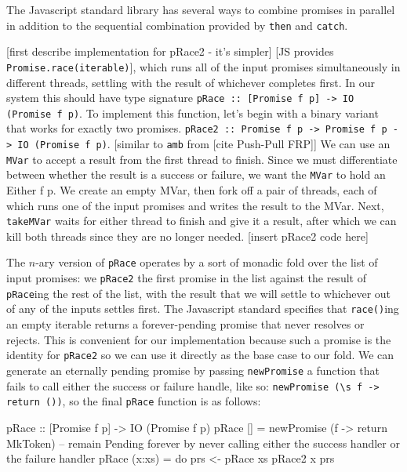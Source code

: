 \documentclass[12pt, english, letterpaper]{kuthesis}
\newcommand{\lit}[1]{\texttt{#1}}
\begin{document}
The Javascript standard library has several ways to combine promises in parallel in addition to the sequential combination provided by \lit{then} and \lit{catch}.

[first describe implementation for pRace2 - it's simpler]
[JS provides \lit{Promise.race(iterable)}], which runs all of the input promises simultaneously in different threads, settling with the result of whichever completes first.  In our system this should have type signature \lit{pRace :: [Promise f p] -> IO (Promise f p)}.  To implement this function, let's begin with a binary variant that works for exactly two promises.  \lit{pRace2 :: Promise f p -> Promise f p -> IO (Promise f p)}.  [similar to \lit {amb} from [cite Push-Pull FRP]]  We can use an \lit{MVar} to accept a result from the first thread to finish.  Since we must differentiate between whether the result is a success or failure, we want the \lit{MVar} to hold an {Either f p}.  We create an empty MVar, then fork off a pair of threads, each of which runs one of the input promises and writes the result to the MVar.  Next, \lit{takeMVar} waits for either thread to finish and give it a result, after which we can kill both threads since they are no longer needed.
[insert pRace2 code here]

The \(n\)-ary version of \lit{pRace} operates by a sort of monadic fold over the list of input promises: we \lit{pRace2} the first promise in the list against the result of \lit{pRace}ing the rest of the list, with the result that we will settle to whichever out of any of the inputs settles first.  The Javascript standard specifies that \lit{race()}ing an empty iterable returns a forever-pending promise that never resolves or rejects.  This is convenient for our implementation because such a promise is the identity for \lit{pRace2} so we can use it directly as the base case to our fold.  We can generate an eternally pending promise by passing \lit{newPromise} a function that fails to call either the success or failure handle, like so: \verb|newPromise (\s f -> return ())|, so the final \lit{pRace} function is as follows:
\begin{code}
pRace :: [Promise f p] -> IO (Promise f p)
pRace [] = newPromise (\s f -> return MkToken) -- remain Pending forever by never calling either the success handler or the failure handler
pRace (x:xs) = do
  prs <- pRace xs
  pRace2 x prs
\end{code}
\end{document}
